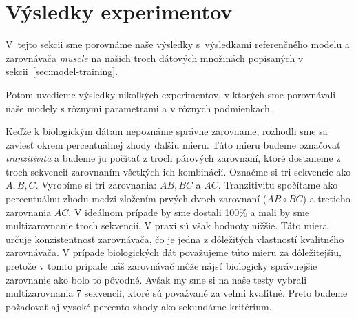 
\section{Výsledky experimentov}
V~tejto sekcii sme porovnáme naše výsledky s~výsledkami referenčného modelu a zarovnávača \textit{muscle} \cite{edgar2004muscle} na našich troch dátových množinách popísaných v sekcii~\ref{sec:model-training}.

Potom uvedieme výsledky nikoľkých experimentov, v ktorých sme porovnávali naše modely s rôznymi parametrami a v rôznych podmienkach.

Keďže k biologickým dátam nepoznáme správne zarovnanie, rozhodli sme sa zaviesť okrem percentuálnej zhody ďalšiu mieru. Túto mieru budeme označovať \textit{tranzitivita} a budeme ju počítať z troch párových zarovnaní, ktoré dostaneme z troch sekvencií zarovnaním všetkých ich kombinácií. Označme si tri  sekvencie ako $A, B, C$. Vyrobíme si tri zarovnania: $AB, BC$ a $AC$. Tranzitivitu spočítame ako percentuálnu zhodu medzi zložením prvých dvoch zarovnaní ($AB \circ BC$) a tretieho zarovnania $AC$. V ideálnom prípade by sme dostali 100\% a mali by sme multizarovnanie troch sekvencií. V praxi sú však hodnoty nižšie.
Táto miera určuje konzistentnosť zarovnávača, čo je jedna z dôležitých vlastností kvalitného zarovnávača. V prípade biologických dát považujeme túto mieru za dôležitejšiu, pretože v tomto prípade náš zarovnávač môže nájsť biologicky správnejšie zarovnanie ako bolo to pôvodné. Avšak my sme si na naše testy vybrali multizarovnania 7 sekvencií, ktoré sú považvané za veľmi kvalitné. Preto budeme požadovať aj vysoké percento zhody ako sekundárne kritérium.

